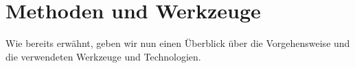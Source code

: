 \section{Methoden und Werkzeuge}
\label{sec:methods-and-tools}

Wie bereits erwähnt, geben wir nun einen Überblick über die Vorgehensweise und die verwendeten Werkzeuge und Technologien.






